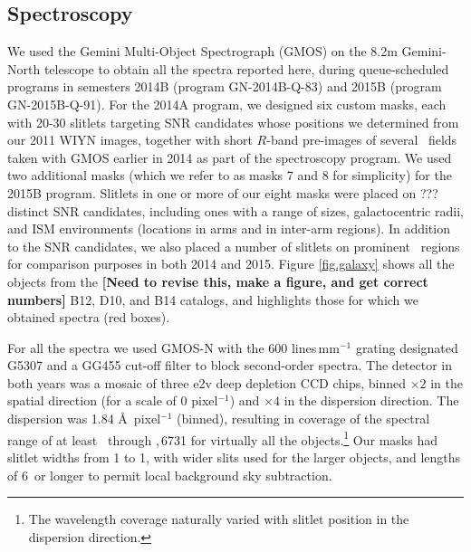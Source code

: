 \subsection{Spectroscopy}


We used the Gemini Multi-Object Spectrograph (GMOS) on the 8.2m Gemini-North telescope to obtain all the spectra reported here, during queue-scheduled programs in semesters 2014B (program GN-2014B-Q-83) and 2015B (program GN-2015B-Q-91).  %
For the 2014A program, we designed six custom masks, each with 20-30 slitlets targeting SNR candidates whose positions we determined from our 2011 WIYN images, together with  short $R$-band pre-images of several \gal\ fields taken with GMOS earlier in 2014 as part of the spectroscopy program.    
We used two additional masks (which we refer to as masks 7 and 8 for simplicity)  for the 2015B program.
 Slitlets in one or more of our eight masks were placed on ??? distinct SNR candidates, including ones with a range of sizes, galactocentric radii, and ISM environments (locations in arms and in 
 inter-arm regions).  In addition to the SNR candidates, we also placed a number of slitlets on prominent \hii\ regions  for comparison purposes in both 2014 and 2015.
Figure \ref{fig.galaxy} shows all the objects from the {\bf [Need to revise this, make a figure, and get correct numbers]} B12, D10, and B14 catalogs, and highlights those for which we obtained spectra (red boxes).  %

For all the spectra we used GMOS-N with the 600 lines\,mm$^{-1}$ grating designated G5307 and a GG455 cut-off filter to block second-order spectra.   The detector in both years was a mosaic of three e2v deep depletion CCD chips, binned $\times 2$ in the spatial direction (for a scale of 0 pixel$^{-1}$) and $\times 4$ in the dispersion direction.  
The dispersion was 1.84 \AA\,  pixel$^{-1}$ (binned), resulting in coverage of the spectral range of at least \hb\ through \sii{},\,6731 for virtually all the objects.\footnote{The wavelength coverage naturally varied with slitlet position in the dispersion direction.}  Our  masks had  slitlet  widths from 1 to 1, with wider slits used for the larger objects, and lengths of 6\arcsec\ or longer to permit local background sky subtraction.   

